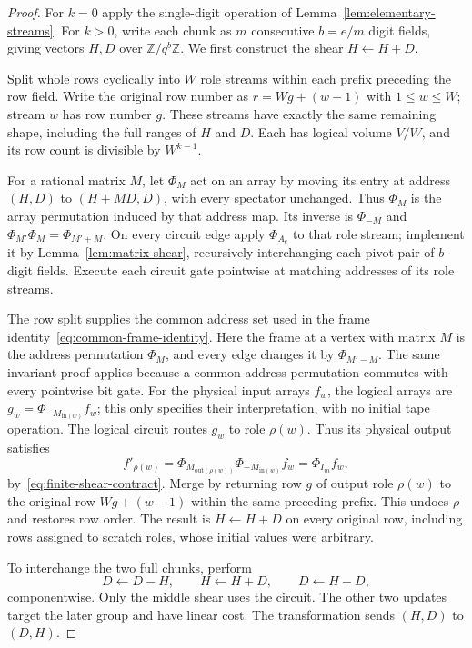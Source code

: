 \documentclass[11pt]{article}
\theoremstyle{definition}
\begin{document}
\begin{proof}
For $k=0$ apply the single-digit operation of
Lemma~\ref{lem:elementary-streams}.  For $k>0$, write each chunk as $m$
consecutive $b=e/m$ digit fields, giving vectors $H,D$ over
$\mathbb Z/q^b\mathbb Z$.  We first construct the shear $H\leftarrow H+D$.

Split whole rows cyclically into $W$ role streams within each prefix
preceding the row field.  Write the original row number as
$r=Wg+(w-1)$ with $1\le w\le W$; stream $w$ has row number $g$.
These streams have exactly the same remaining shape, including the
full ranges of $H$ and $D$.  Each has
logical volume $V/W$, and its row count is divisible by $W^{k-1}$.

For a rational matrix $M$, let $\Phi_M$ act on an array by moving its
entry at address $(H,D)$ to $(H+MD,D)$, with every spectator unchanged.
Thus $\Phi_M$ is the array permutation induced by that address map.
Its inverse is $\Phi_{-M}$ and
$\Phi_{M'}\Phi_M=\Phi_{M'+M}$.  On every circuit edge apply
$\Phi_{A_e}$ to that role stream; implement it by
Lemma~\ref{lem:matrix-shear}, recursively interchanging each pivot pair
of $b$-digit fields.  Execute each circuit gate pointwise at matching
addresses of its role streams.

The row split supplies the common address set used in the
frame identity~\eqref{eq:common-frame-identity}. Here the frame at a
vertex with matrix $M$ is the address permutation $\Phi_M$, and every
edge changes it by $\Phi_{M'-M}$. The same invariant proof applies
because a common address permutation commutes with every pointwise
bit gate. For the physical input arrays $f_w$, the logical arrays are
$g_w=\Phi_{-M_{\mathrm{in}(w)}}f_w$; this only specifies their
interpretation, with no initial tape operation. The logical circuit
routes $g_w$ to role $\rho(w)$. Thus its physical output satisfies
\[
 f'_{\rho(w)}
 =\Phi_{M_{\mathrm{out}(\rho(w))}}
   \Phi_{-M_{\mathrm{in}(w)}}f_w
 =\Phi_{I_m}f_w,
\]
by~\eqref{eq:finite-shear-contract}. Merge by returning row $g$ of
output role $\rho(w)$ to the original row $Wg+(w-1)$ within the same
preceding prefix. This undoes $\rho$ and restores row order. The result
is $H\leftarrow H+D$ on every original row, including rows assigned
to scratch roles, whose initial values were arbitrary.

To interchange the two full chunks, perform
\[
 D\leftarrow D-H,\qquad H\leftarrow H+D,\qquad D\leftarrow H-D,
\]
componentwise.  Only the middle shear uses the circuit.  The other two
updates target the later group and have linear cost.  The transformation
sends $(H,D)$ to $(D,H)$.


\end{proof}
\end{document}
